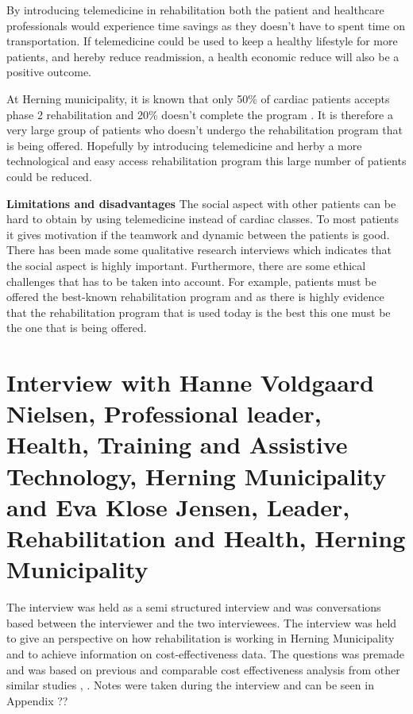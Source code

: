 By introducing telemedicine in rehabilitation both the patient and healthcare professionals would experience time savings as they doesn’t have to spent time on transportation. If telemedicine could be used to keep a healthy lifestyle for more patients, and hereby reduce readmission, a health economic reduce will also be a positive outcome. 

At Herning municipality, it is known that only 50\% of cardiac patients accepts phase 2 rehabilitation and 20\% doesn’t complete the program \cite{rehab}. It is therefore a very large group of patients who doesn’t undergo the rehabilitation program that is being offered. Hopefully by introducing telemedicine and herby a more technological and easy access rehabilitation program this large number of patients could be reduced. 

\textbf{Limitations and disadvantages} \newline
The social aspect with other patients can be hard to obtain by using telemedicine instead of cardiac classes. To most patients it gives motivation if the teamwork and dynamic between the patients is good. There has been made some qualitative research interviews which indicates that the social aspect is highly important. Furthermore, there are some ethical challenges that has to be taken into account. For example, patients must be offered the best-known rehabilitation program and as there is highly evidence that the rehabilitation program that is used today is the best this one must be the one that is being offered.  

\section{Interview with Hanne Voldgaard Nielsen, Professional leader, Health, Training and Assistive Technology, Herning Municipality and Eva Klose Jensen, Leader, Rehabilitation and Health, Herning Municipality}\label{sec: evahanne}

The interview was held as a semi structured interview and was conversations based between the interviewer and the two interviewees. The interview was held to give an perspective on how rehabilitation is working in Herning Municipality and to achieve information on cost-effectiveness data. The questions was premade and was based on previous and comparable cost effectiveness analysis from other similar studies \cite{costeffect}, \cite{usingeffect}. Notes were taken during the interview and can be seen in Appendix ??

